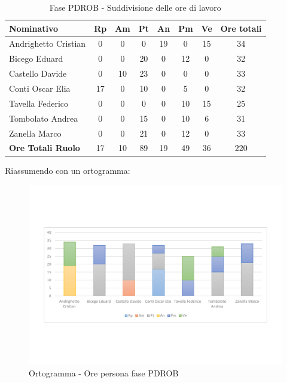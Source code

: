 \documentclass[../PianoProgetto.tex]{subfiles}
\begin{document}
	\begin{table}[h]
	
		\begin{tabularx}{\textwidth}{l  * {6}{C}  c}
			\toprule
			\textbf{Nominativo} & \textbf{Rp} & \textbf{Am} & \textbf{Pt} 
						& \textbf{An} & \textbf{Pm} & \textbf{Ve} & \textbf{Ore totali} \\
			\midrule
			Andrighetto Cristian & 0 &	0 &	0 &	19 & 0 & 15 & 34 \\
			Bicego Eduard & 0 &	0 &	20 & 0 & 12 & 0 & 32 \\
			Castello Davide & 0 & 10 & 23 &	0 &	0 &	0 &	33 \\
			Conti Oscar Elia & 17 &	0 &	10 & 0 & 5 & 0 & 32 \\
			Tavella Federico &	0 &	0 &	0 &	0 &	10 & 15 & 25 \\
			Tombolato Andrea & 0 & 0 &	15 & 0 & 10 & 6 & 31 \\
			Zanella Marco & 0 & 0 &	21 & 0 & 12 & 0 & 33 \\
			\midrule			
			\textbf{Ore Totali Ruolo} & 17 & 10 & 89 & 19 & 49 &	36 & 220 \\
			\bottomrule
		\end{tabularx}
		\caption{Fase PDROB - Suddivisione delle ore di lavoro}
		\label{tab:fasePDROB_ore}
	\end{table}
\vfill
\newpage
\vfill	
	Riassumendo con un ortogramma:	
	
	\begin{figure}[!h]
		\centering
		\includegraphics[width=\textwidth , trim=2cm 5cm 2cm 5cm]{grafici/PDROB/PDROB-ore-persona}
			\caption{Ortogramma - Ore persona fase PDROB}
		\label{fig:BarChart-fasePDROB_ore}
	\end{figure}
\vfill	
\end{document}

